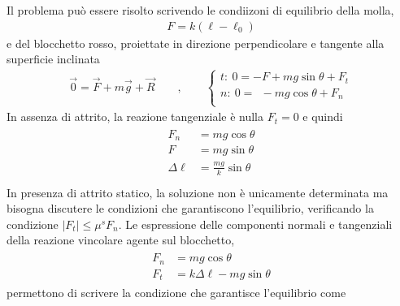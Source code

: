 \documentclass[letterpaper,10pt,italian]{jupyterBook}
\begin{document}
\sphinxAtStartPar
Il problema può essere risolto scrivendo le condiizoni di equilibrio della molla,
\begin{equation*}
\begin{split}F = k (\ell - \ell_0)\end{split}
\end{equation*}
\sphinxAtStartPar
e del blocchetto rosso, proiettate in direzione perpendicolare e tangente alla superficie inclinata
\begin{equation*}
\begin{split}
  \vec{0} = \vec{F} + m \vec{g} + \vec{R}
  \qquad , \qquad
  \begin{cases}
    t: \ 0 = - F + m g \sin \theta + F_t \\
    n: \ 0 = \ \ - m g \cos \theta + F_n \\
  \end{cases}
  \end{split}
\end{equation*}
\sphinxAtStartPar
{} In assenza di attrito, la reazione tangenziale è nulla \(F_t = 0\) e quindi
\begin{equation*}
\begin{split}\begin{aligned}
  F_n          & = m g \cos \theta \\
  F            & = m g \sin \theta \\
  \Delta \ell  & = \frac{m g}{k} \sin \theta \\
\end{aligned}\end{split}
\end{equation*}
\sphinxAtStartPar
{} In presenza di attrito statico, la soluzione non è unicamente determinata ma bisogna discutere le condizioni che garantiscono l’equilibrio, verificando la condizione \(|F_t| \le \mu^s F_n\). Le espressione delle componenti normali e tangenziali della reazione vincolare agente sul blocchetto,
\begin{equation*}
\begin{split}\begin{aligned}
  F_n & = m g \cos \theta \\
  F_t & = k \Delta \ell - m g \sin \theta
\end{aligned}\end{split}
\end{equation*}
\sphinxAtStartPar
permettono di scrivere la condizione che garantisce l’equilibrio come
\end{document}
